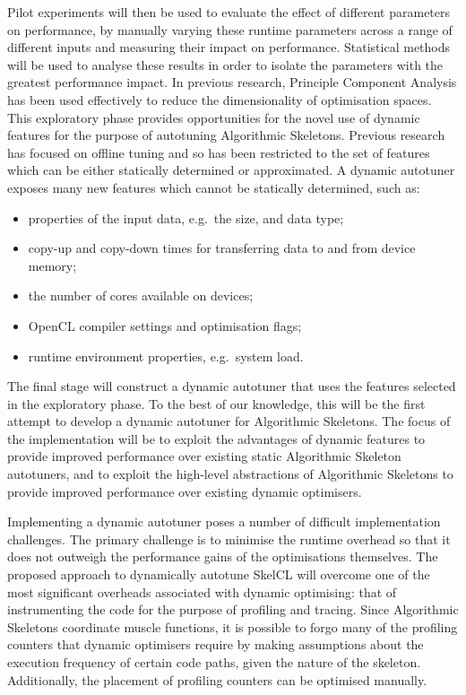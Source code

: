 Pilot experiments will then be used to evaluate the effect of
different parameters on performance, by manually varying these runtime
parameters across a range of different inputs and measuring their
impact on performance. Statistical methods will be used to analyse
these results in order to isolate the parameters with the greatest
performance impact. In previous research, Principle Component Analysis
has been used effectively to reduce the dimensionality of optimisation
spaces. This exploratory phase provides opportunities for the novel
use of dynamic features for the purpose of autotuning Algorithmic
Skeletons. Previous research has focused on offline tuning and so has
been restricted to the set of features which can be either statically
determined or approximated. A dynamic autotuner exposes many new
features which cannot be statically determined, such as:

\begin{itemize}
\item properties of the input data, e.g.\ the size, and data type;
\item copy-up and copy-down times for transferring data to and from
  device memory;
\item the number of cores available on devices;
\item OpenCL compiler settings and optimisation flags;
\item runtime environment properties, e.g.\ system load.
\end{itemize}

The final stage will construct a dynamic autotuner that uses the
features selected in the exploratory phase. To the best of our
knowledge, this will be the first attempt to develop a dynamic
autotuner for Algorithmic Skeletons. The focus of the implementation
will be to exploit the advantages of dynamic features to provide
improved performance over existing static Algorithmic Skeleton
autotuners, and to exploit the high-level abstractions of Algorithmic
Skeletons to provide improved performance over existing dynamic
optimisers.

Implementing a dynamic autotuner poses a number of difficult
implementation challenges. The primary challenge is to minimise the
runtime overhead so that it does not outweigh the performance gains of
the optimisations themselves. The proposed approach to dynamically
autotune SkelCL will overcome one of the most significant overheads
associated with dynamic optimising: that of instrumenting the code for
the purpose of profiling and tracing. Since Algorithmic Skeletons
coordinate muscle functions, it is possible to forgo many of the
profiling counters that dynamic optimisers require by making
assumptions about the execution frequency of certain code paths, given
the nature of the skeleton. Additionally, the placement of profiling
counters can be optimised manually.

